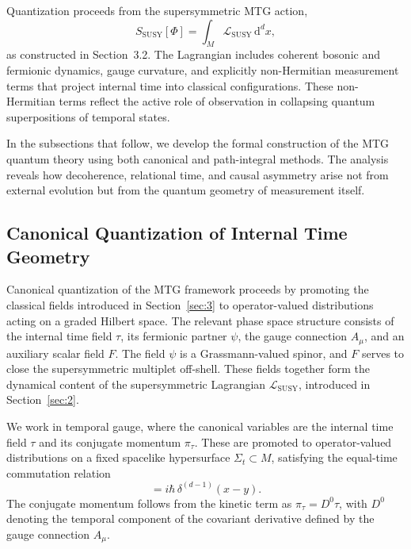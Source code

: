 \documentclass[11pt]{article}
\begin{document}
Quantization proceeds from the supersymmetric MTG action,
\begin{equation}
S_{\mathrm{SUSY}}[\Phi] = \int_M \mathcal{L}_{\mathrm{SUSY}} \, \mathrm{d}^d x,
\end{equation}
as constructed in Section~3.2. The Lagrangian includes coherent bosonic and fermionic dynamics, gauge curvature, and explicitly non-Hermitian measurement terms that project internal time into classical configurations. These non-Hermitian terms reflect the active role of observation in collapsing quantum superpositions of temporal states.

In the subsections that follow, we develop the formal construction of the MTG quantum theory using both canonical and path-integral methods. The analysis reveals how decoherence, relational time, and causal asymmetry arise not from external evolution but from the quantum geometry of measurement itself.

\subsection{Canonical Quantization of Internal Time Geometry}
Canonical quantization of the MTG framework proceeds by promoting the classical fields introduced in Section~\ref{sec:3} to operator-valued distributions acting on a graded Hilbert space. The relevant phase space structure consists of the internal time field \( \tau \), its fermionic partner \( \psi \), the gauge connection \( A_\mu \), and an auxiliary scalar field \( F \). The field \( \psi \) is a Grassmann-valued spinor, and \( F \) serves to close the supersymmetric multiplet off-shell. These fields together form the dynamical content of the supersymmetric Lagrangian \( \mathcal{L}_{\mathrm{SUSY}} \), introduced in Section~\ref{sec:2}.

We work in temporal gauge, where the canonical variables are the internal time field \( \tau \) and its conjugate momentum \( \pi_\tau \). These are promoted to operator-valued distributions on a fixed spacelike hypersurface \( \Sigma_t \subset M \), satisfying the equal-time commutation relation
\begin{equation}
[\hat{\tau}(x), \hat{\pi}_\tau(y)] = i \hbar \, \delta^{(d-1)}(x - y).
\end{equation}
The conjugate momentum follows from the kinetic term as \( \pi_\tau = D^0 \tau \), with \( D^0 \) denoting the temporal component of the covariant derivative defined by the gauge connection \( A_\mu \).
\end{document}
